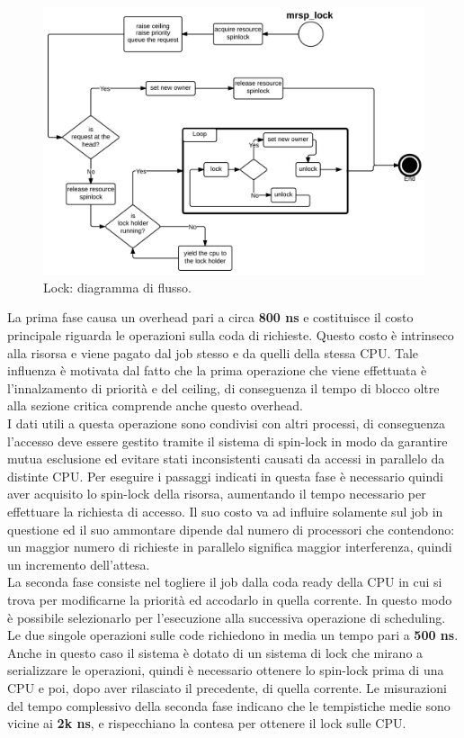 \begin{figure}
\includegraphics[width=\linewidth]{images/mrsp_lock.jpeg}
\caption{Lock: diagramma di flusso.}
\label{fig:mrsplock}
\end{figure}

\noindent La prima fase causa un overhead pari a circa \textbf{800 ns} e costituisce il costo principale riguarda le operazioni sulla coda di richieste. Questo costo è intrinseco alla risorsa e viene pagato dal job stesso e da quelli della stessa CPU. Tale influenza è motivata dal fatto che la prima operazione che viene effettuata è l'innalzamento di priorità e del ceiling, di conseguenza il tempo di blocco oltre alla sezione critica comprende anche questo overhead.\\

\noindent I dati utili a questa operazione sono condivisi con altri processi, di conseguenza l'accesso deve essere gestito tramite il sistema di spin-lock in modo da garantire mutua esclusione ed evitare stati inconsistenti causati da accessi in parallelo da distinte CPU. Per eseguire i passaggi indicati in questa fase è necessario quindi aver acquisito lo spin-lock della risorsa, aumentando il tempo necessario per effettuare la richiesta di accesso. Il suo costo va ad influire solamente sul job in questione ed il suo ammontare dipende dal numero di processori che contendono: un maggior numero di richieste in parallelo significa maggior interferenza, quindi un incremento dell'attesa.\\

\noindent La seconda fase consiste nel togliere il job dalla coda ready della CPU in cui si trova per modificarne la priorità ed accodarlo in quella corrente. In questo modo è possibile selezionarlo per l'esecuzione alla successiva operazione di scheduling. Le due singole operazioni sulle code richiedono in media un tempo pari a \textbf{500 ns}. Anche in questo caso il sistema è dotato di un sistema di lock che mirano a serializzare le operazioni, quindi è necessario ottenere lo spin-lock prima di una CPU e poi, dopo aver rilasciato il precedente, di quella corrente. Le misurazioni del tempo complessivo della seconda fase indicano che le tempistiche medie sono vicine ai \textbf{2k ns}, e rispecchiano la contesa per ottenere il lock sulle CPU.\\

